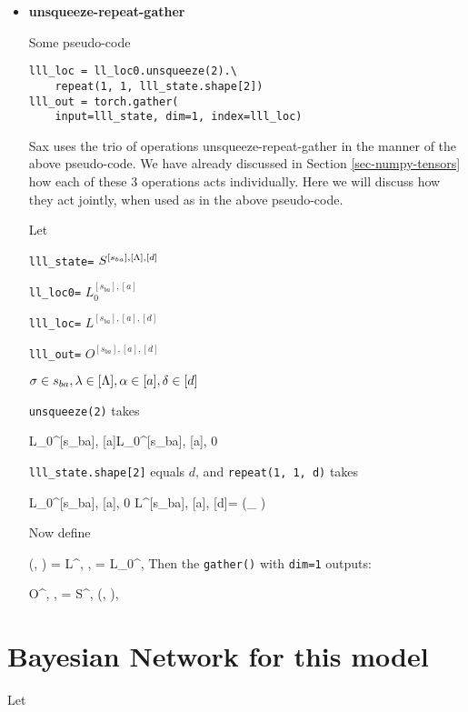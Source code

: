 \begin{itemize}
\item {\bf unsqueeze-repeat-gather}

Some pseudo-code
\begin{mdframed}[hidealllines=true,backgroundcolor=blue!10]
\begin{verbatim}
lll_loc = ll_loc0.unsqueeze(2).\
    repeat(1, 1, lll_state.shape[2])
lll_out = torch.gather(
    input=lll_state, dim=1, index=lll_loc)
\end{verbatim}
\end{mdframed}
Sax uses the trio of operations unsqueeze-repeat-gather
in the manner of the above pseudo-code. We have already 
discussed in Section \ref{sec-numpy-tensors}
how each of these 3 operations
acts individually. Here we will discuss how they
act jointly, when used as in the above
pseudo-code.

Let

{\tt lll\_state=} $S^{[s_{ba}],[\Lambda], [d]}$

{\tt ll\_loc0=} $L_0^{[s_{ba}], [a]}$

{\tt lll\_loc=} $L^{[s_{ba}], [a], [d]}$

{\tt lll\_out=} $O^{[s_{ba}], [a], [d]}$

$\sigma\in s_{ba}, \lambda \in[\Lambda], \alpha\in[a], \delta\in[d]$

{\tt unsqueeze(2)} takes 

\beq
L_0^{[s_{ba}], [a]}\rarrow L_0^{[s_{ba}], [a], 0}
\eeq

{\tt lll\_state.shape[2]} equals $d$, and {\tt repeat(1, 1, d)}
takes

\beq
L_0^{[s_{ba}], [a], 0}\rarrow
L^{[s_{ba}], [a], [d]}= 
(_
{}) 
\eeq

Now define 

\beq
\lam(\s, \alp)
=
L^{\s, \alp, \delta}=
L_0^{\s, \alp}
\eeq 
Then the {\tt gather()} 
with {\tt dim=1} outputs:

\beq 
O^{\s, \alp, \delta}=
S^{\s, \lam(\s, \alp), \delta}
\eeq





\end{itemize}

\section{Bayesian Network for this model}

Let

